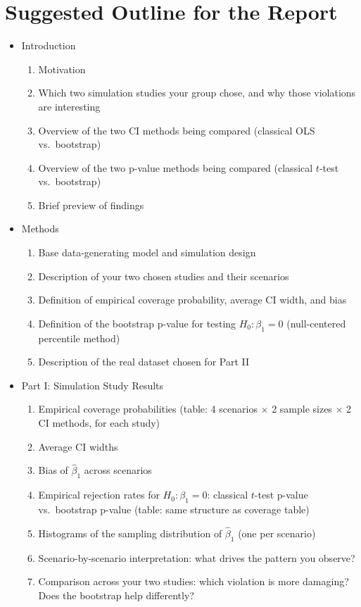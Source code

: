 \documentclass[12pt]{article}
\begin{document}
\section*{Suggested Outline for the Report}
\begin{itemize}
    \item Introduction
    \begin{enumerate}
        \item Motivation
        \item Which two simulation studies your group chose, and why those violations are interesting
        \item Overview of the two CI methods being compared (classical OLS vs.\ bootstrap)
        \item Overview of the two p-value methods being compared (classical $t$-test vs.\ bootstrap)
        \item Brief preview of findings
    \end{enumerate}

    \item Methods
    \begin{enumerate}
        \item Base data-generating model and simulation design
        \item Description of your two chosen studies and their scenarios
        \item Definition of empirical coverage probability, average CI width, and bias
        \item Definition of the bootstrap p-value for testing $H_0\colon \beta_1 = 0$ (null-centered percentile method)
        \item Description of the real dataset chosen for Part II
    \end{enumerate}

    \item Part I: Simulation Study Results
    \begin{enumerate}
        \item Empirical coverage probabilities (table: 4 scenarios $\times$ 2 sample sizes $\times$ 2 CI methods, for each study)
        \item Average CI widths
        \item Bias of $\hat{\beta}_1$ across scenarios
        \item Empirical rejection rates for $H_0\colon \beta_1 = 0$: classical $t$-test p-value vs.\ bootstrap p-value (table: same structure as coverage table)
        \item Histograms of the sampling distribution of $\hat{\beta}_1$ (one per scenario)
        \item Scenario-by-scenario interpretation: what drives the pattern you observe?
        \item Comparison across your two studies: which violation is more damaging? Does the bootstrap help differently?
    \end{enumerate}


\end{itemize}
\end{document}
